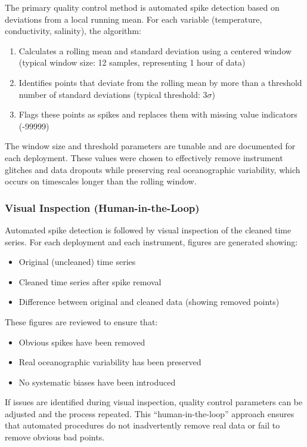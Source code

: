 The primary quality control method is automated spike detection based on deviations from a local running mean. For each variable (temperature, conductivity, salinity), the algorithm:

\begin{enumerate}
    \item Calculates a rolling mean and standard deviation using a centered window (typical window size: 12 samples, representing 1 hour of data)
    \item Identifies points that deviate from the rolling mean by more than a threshold number of standard deviations (typical threshold: 3$\sigma$)
    \item Flags these points as spikes and replaces them with missing value indicators (-99999)
\end{enumerate}

The window size and threshold parameters are tunable and are documented for each deployment. These values were chosen to effectively remove instrument glitches and data dropouts while preserving real oceanographic variability, which occurs on timescales longer than the rolling window.

\subsubsection{Visual Inspection (Human-in-the-Loop)}

Automated spike detection is followed by visual inspection of the cleaned time series. For each deployment and each instrument, figures are generated showing:
\begin{itemize}
    \item Original (uncleaned) time series
    \item Cleaned time series after spike removal
    \item Difference between original and cleaned data (showing removed points)
\end{itemize}

These figures are reviewed to ensure that:
\begin{itemize}
    \item Obvious spikes have been removed
    \item Real oceanographic variability has been preserved
    \item No systematic biases have been introduced
\end{itemize}

If issues are identified during visual inspection, quality control parameters can be adjusted and the process repeated. This ``human-in-the-loop'' approach ensures that automated procedures do not inadvertently remove real data or fail to remove obvious bad points.

